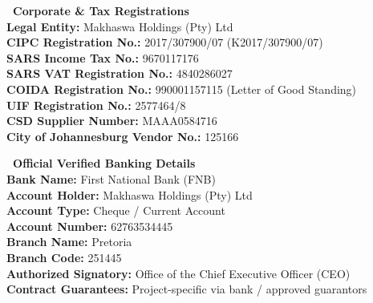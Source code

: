\documentclass[a4paper,11pt]{article}
\begin{document}
\noindent
\begin{minipage}[t]{0.485\textwidth}
    \begin{tcolorbox}[enhanced, colback=white, colframe=mhlightgray, boxrule=0.8pt, arc=4pt, left=8pt, right=8pt, top=7pt, bottom=7pt, drop shadow=black!3]
        {\fontsize{8.5pt}{11pt}\selectfont\bfseries\color{mhnavy}\faFileContract\ Corporate \& Tax Registrations}\\[3pt]
        {\fontsize{7.8pt}{11.0pt}\selectfont\color{mhtext}
        \textbf{Legal Entity:} Makhaswa Holdings (Pty) Ltd\\
        \textbf{CIPC Registration No.:} 2017/307900/07 (K2017/307900/07)\\
        \textbf{SARS Income Tax No.:} 9670117176\\
        \textbf{SARS VAT Registration No.:} 4840286027\\
        \textbf{COIDA Registration No.:} 990001157115 (Letter of Good Standing)\\
        \textbf{UIF Registration No.:} 2577464/8\\
        \textbf{CSD Supplier Number:} MAAA0584716\\
        \textbf{City of Johannesburg Vendor No.:} 125166
        }
    \end{tcolorbox}
\end{minipage}
\hfill
\begin{minipage}[t]{0.485\textwidth}
    \begin{tcolorbox}[enhanced, colback=white, colframe=mhlightgray, boxrule=0.8pt, arc=4pt, left=8pt, right=8pt, top=7pt, bottom=7pt, drop shadow=black!3]
        {\fontsize{8.5pt}{11pt}\selectfont\bfseries\color{mhnavy}\faUniversity\ Official Verified Banking Details}\\[3pt]
        {\fontsize{7.8pt}{11.0pt}\selectfont\color{mhtext}
        \textbf{Bank Name:} First National Bank (FNB)\\
        \textbf{Account Holder:} Makhaswa Holdings (Pty) Ltd\\
        \textbf{Account Type:} Cheque / Current Account\\
        \textbf{Account Number:} 62763534445\\
        \textbf{Branch Name:} Pretoria\\
        \textbf{Branch Code:} 251445\\
        \textbf{Authorized Signatory:} Office of the Chief Executive Officer (CEO)\\
        \textbf{Contract Guarantees:} Project-specific via bank / approved guarantors
        }
    \end{tcolorbox}
\end{minipage}
\end{document}
